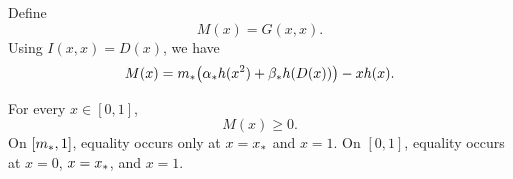 Define
\begin{equation}\label{eq:Mdef}
  M(x)=G(x,x).
\end{equation}
Using \(I(x,x)=D(x)\), we have
\begin{equation}\label{eq:Mformula}
  M(x)=m_*\bigl(\alpha_* h(x^2)+\beta_* h(D(x))\bigr)-xh(x).
\end{equation}

\begin{lemma}\label{lem:diagonal}
For every \(x\in[0,1]\),
\begin{equation}\label{eq:Mnonneg}
  M(x)\ge0.
\end{equation}
On \([m_*,1]\), equality occurs only at \(x=x_*\) and \(x=1\).  On \([0,1]\), equality occurs at \(x=0\), \(x=x_*\), and \(x=1\).
\end{lemma}

